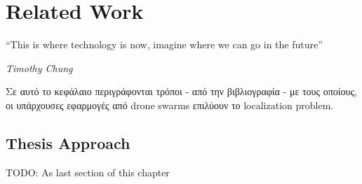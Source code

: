 \chapter{Related Work} %
\label{chap:Chapter3}       %
\epigraph{``This is where technology is now, imagine where we can go in the future” }{\textit{Timothy Chung}}

Σε αυτό το κεφάλαιο περιγράφονται τρόποι - από την βιβλιογραφία - με τους οποίους, οι υπάρχουσες εφαρμογές 
από drone swarms επιλύουν το localization problem. 

\cite{trilateration-application1}
\section{Thesis Approach}
TODO: As last section of this chapter
